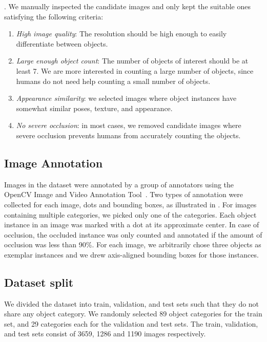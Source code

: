 . 
We manually inspected the candidate images and only kept the suitable ones satisfying the following criteria: 
\begin{enumerate} \denselist
    \item \textit{High image quality}: The resolution should be high enough to easily differentiate between objects. 
    \item \textit{Large enough object count}: The number of objects of interest should be at least 7. We are more interested in counting a large number of objects, since humans do not need help counting a small number of objects. 
    \item \textit{Appearance similarity}: we selected images where object instances have somewhat similar poses, texture, and appearance.  
    \item \textit{No severe occlusion}: in most cases, we removed candidate images where severe occlusion prevents humans from accurately counting the objects. 
\end{enumerate}

\subsection{Image Annotation}
Images in the dataset were annotated by a group of annotators using the OpenCV Image and Video Annotation Tool~\cite{CVAT}. Two types of annotation were collected for each image, dots and bounding boxes, as illustrated in  . For images containing multiple categories, we picked only one of the categories. Each object instance in an image was marked with a dot at its approximate center. In case of occlusion, the occluded instance was only counted and annotated if the amount of occlusion was less than 90\%. For each image, we arbitrarily chose three objects as exemplar instances and we drew axis-aligned bounding boxes for those instances. 

\subsection{Dataset split}
We divided the dataset into train, validation, and test sets such that they do not share any object category. We randomly selected 89 object categories for the train set, and 29 categories each for the validation and test sets. The train, validation, and test sets consist of 3659, 1286 and 1190 images respectively.
 
